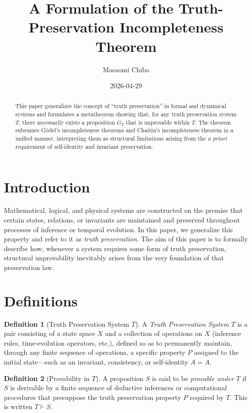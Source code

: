 \documentclass[11pt,a4paper]{article}
\title{A Formulation of the Truth-Preservation Incompleteness Theorem}
\author{Masaomi Chiba}
\date{2026-04-29}
\theoremstyle{definition}
\newtheorem{definition}{Definition}[section]
\begin{document}
\maketitle

\begin{abstract}
This paper generalizes the concept of ``truth preservation'' in formal and dynamical systems and formulates a metatheorem showing that, for any truth preservation system $T$, there necessarily exists a proposition $G_T$ that is unprovable within $T$. The theorem subsumes G\"{o}del's incompleteness theorems and Chaitin's incompleteness theorem in a unified manner, interpreting them as structural limitations arising from the \emph{a priori} requirement of self-identity and invariant preservation.
\end{abstract}

\section{Introduction}

Mathematical, logical, and physical systems are constructed on the premise that certain states, relations, or invariants are maintained and preserved throughout processes of inference or temporal evolution. In this paper, we generalize this property and refer to it as \emph{truth preservation}. The aim of this paper is to formally describe how, whenever a system requires some form of truth preservation, structural unprovability inevitably arises from the very foundation of that preservation law.

\section{Definitions}

\begin{definition}[Truth Preservation System $T$]
A \emph{Truth Preservation System} $T$ is a pair consisting of a state space $X$ and a collection of operations on $X$ (inference rules, time-evolution operators, etc.), defined so as to permanently maintain, through any finite sequence of operations, a specific property $P$ assigned to the initial state---such as an invariant, consistency, or self-identity $A = A$.
\end{definition}

\begin{definition}[Provability in $T$]
A proposition $S$ is said to be \emph{provable under $T$} if $S$ is derivable by a finite sequence of deductive inferences or computational procedures that presuppose the truth preservation property $P$ required by $T$. This is written $T \vdash S$.
\end{definition}
\end{document}
